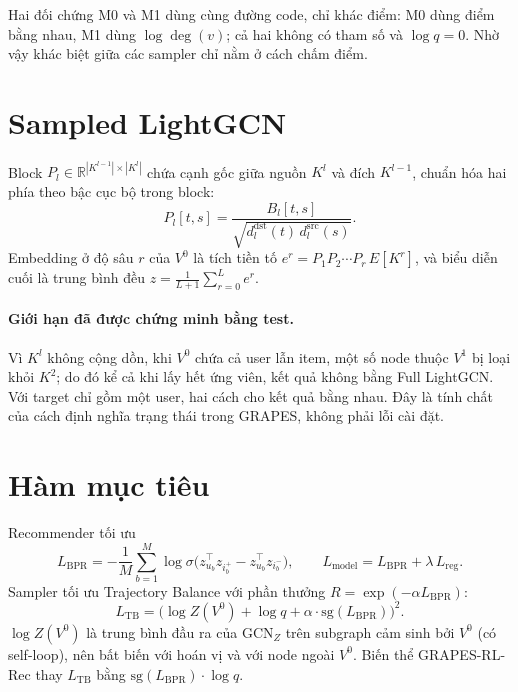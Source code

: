 \documentclass[11pt,a4paper,oneside]{report}
\begin{document}
Hai đối chứng M0 và M1 dùng cùng đường code, chỉ khác điểm: M0 dùng điểm bằng nhau, M1 dùng $\log\deg(v)$; cả hai không có tham số và $\log q = 0$. Nhờ vậy khác biệt giữa các sampler chỉ nằm ở cách chấm điểm.

\section{Sampled LightGCN}
Block $P_l \in \mathbb{R}^{|K^{l-1}|\times|K^l|}$ chứa cạnh gốc giữa nguồn $K^l$ và đích $K^{l-1}$, chuẩn hóa hai phía theo bậc cục bộ trong block:
\[
P_l[t,s] = \frac{B_l[t,s]}{\sqrt{d^{\text{dst}}_l(t)\, d^{\text{src}}_l(s)}}.
\]
Embedding ở độ sâu $r$ của $V^0$ là tích tiền tố $e^{r} = P_1 P_2\cdots P_r\, E[K^r]$, và biểu diễn cuối là trung bình đều $z = \frac{1}{L+1}\sum_{r=0}^{L} e^{r}$.

\paragraph{Giới hạn đã được chứng minh bằng test.} Vì $K^l$ không cộng dồn, khi $V^0$ chứa cả user lẫn item, một số node thuộc $V^1$ bị loại khỏi $K^2$; do đó kể cả khi lấy hết ứng viên, kết quả không bằng Full LightGCN. Với target chỉ gồm một user, hai cách cho kết quả bằng nhau. Đây là tính chất của cách định nghĩa trạng thái trong GRAPES, không phải lỗi cài đặt.

\section{Hàm mục tiêu}
Recommender tối ưu
\[
L_{\text{BPR}} = -\frac{1}{M}\sum_{b=1}^{M}\log\sigma\big(z_{u_b}^\top z_{i_b^+} - z_{u_b}^\top z_{i_b^-}\big), \qquad L_{\text{model}} = L_{\text{BPR}} + \lambda\,L_{\text{reg}}.
\]
Sampler tối ưu Trajectory Balance \cite{tb} với phần thưởng $R = \exp(-\alpha L_{\text{BPR}})$:
\[
L_{\text{TB}} = \Big(\log Z(V^0) + \log q + \alpha\cdot\mathrm{sg}(L_{\text{BPR}})\Big)^2.
\]
$\log Z(V^0)$ là trung bình đầu ra của $\mathrm{GCN}_Z$ trên subgraph cảm sinh bởi $V^0$ (có self-loop), nên bất biến với hoán vị và với node ngoài $V^0$. Biến thể GRAPES-RL-Rec thay $L_{\text{TB}}$ bằng $\mathrm{sg}(L_{\text{BPR}})\cdot\log q$.
\end{document}
